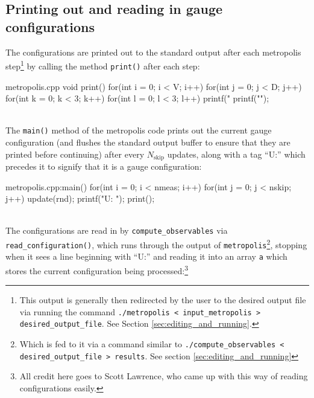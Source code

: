 \documentclass[11pt]{article}
\begin{document}
\subsection{Printing out and reading in gauge configurations}

\label{sec:printing}

The configurations are printed out to the standard output after each metropolis step\footnote{This output is generally then redirected by the user to the desired output file via running the command \lstinline{./metropolis < input_metropolis > desired_output_file}. See Section \ref{sec:editing_and_running}.} by calling the method \lstinline{print()} after each step:\\

\begin{code}{metropolis.cpp}
void print()
{
        for(int i = 0; i < V; i++){
                for(int j = 0; j < D; j++){
                        for(int k = 0; k < 3; k++){
                                for(int l = 0; l < 3; l++){
                                        printf("%
                                }
                        }
                }
        }
        printf("\n");
}
\end{code}\\

The \lstinline{main()} method of the metropolis code prints out the current gauge configuration (and flushes the standard output buffer to ensure that they are printed before continuing) after every $N_{\mathrm{skip}}$ updates, along with a tag ``U:'' which precedes it to signify that it is a gauge configuration:\\

\begin{code}{metropolis.cpp:main()}
for(int i = 0; i < nmeas; i++){
	for(int j = 0; j < nskip; j++) update(rnd);
	printf("U: "); print();
}
\end{code}\\

The configurations are read in by \lstinline{compute_observables} via \lstinline{read_configuration()}, which runs through the output of \lstinline{metropolis}\footnote{Which is fed to it via a command similar to \lstinline{./compute_observables < desired_output_file > results}. See section \ref{sec:editing_and_running}}, stopping when it sees a line beginning with ``U:'' and reading it into an array \lstinline{a} which stores the current configuration being processed:\footnote{All credit here goes to Scott Lawrence, who came up with this way of reading configurations easily.}\\
\end{document}
